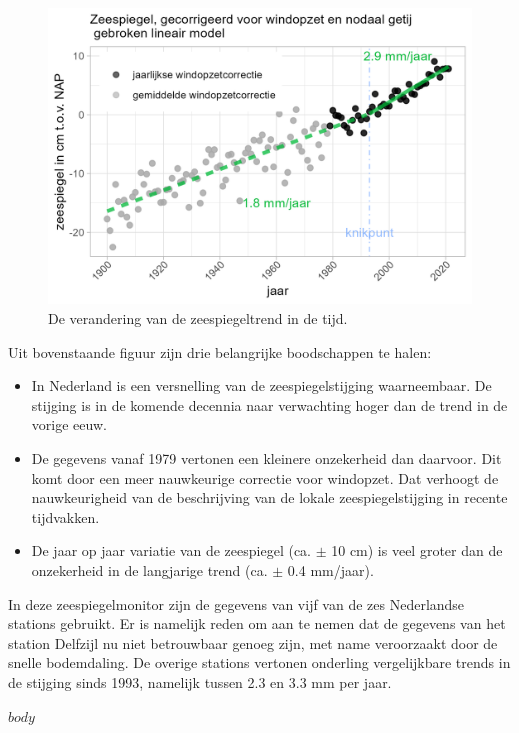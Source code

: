 \documentclass[signature,dutch, biblatex,ddraft]{deltares_report}
\begin{document}
{\begin{figure}[h]

{\centering \includegraphics[width=0.7\linewidth]{figures/samenvatting_v2} 

}

\caption{De verandering van de zeespiegeltrend in de tijd.}\label{fig:unnamed-chunk-2}
\end{figure}

Uit bovenstaande figuur zijn drie belangrijke boodschappen te halen:

\begin{itemize}
\tightlist
\item
  In Nederland is een versnelling van de zeespiegelstijging waarneembaar. De stijging is in de komende decennia naar verwachting hoger dan de trend in de vorige eeuw.
\item
  De gegevens vanaf 1979 vertonen een kleinere onzekerheid dan daarvoor. Dit komt door een meer nauwkeurige correctie voor windopzet. Dat verhoogt de nauwkeurigheid van de beschrijving van de lokale zeespiegelstijging in recente tijdvakken.
\item
  De jaar op jaar variatie van de zeespiegel (ca. \(\pm\) 10 cm) is veel groter dan de onzekerheid in de langjarige trend (ca. \(\pm\) 0.4 mm/jaar).
\end{itemize}

In deze zeespiegelmonitor zijn de gegevens van vijf van de zes Nederlandse stations gebruikt. Er is namelijk reden om aan te nemen dat de gegevens van het station Delfzijl nu niet betrouwbaar genoeg zijn, met name veroorzaakt door de snelle bodemdaling. De overige stations vertonen onderling vergelijkbare trends in de stijging sinds 1993, namelijk tussen 2.3 en 3.3 mm per jaar.
}
\deltarestitle


$body$

\end{document}
